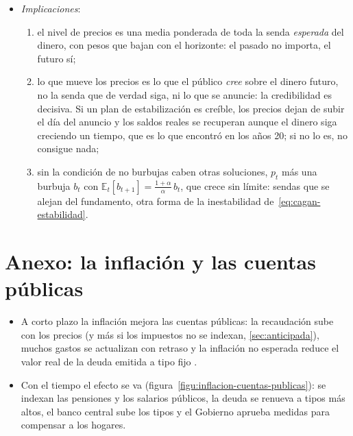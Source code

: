 \documentclass[11pt]{article}
\begin{document}
\begin{itemize}
\item \emph{Implicaciones}:
  \begin{enumerate}
  \item el nivel de precios es una media ponderada de toda la senda \emph{esperada} del dinero, con pesos que bajan con el horizonte: el pasado no importa, el futuro sí;
  \item lo que mueve los precios es lo que el público \emph{cree} sobre el dinero futuro, no la senda que de verdad siga, ni lo que se anuncie: la credibilidad es decisiva. Si un plan de estabilización es creíble, los precios dejan de subir el día del anuncio y los saldos reales se recuperan aunque el dinero siga creciendo un tiempo, que es lo que \textcite{Sargent1982Ends} encontró en los años 20; si no lo es, no consigue nada;
  \item sin la condición de no burbujas caben otras soluciones, $p_t$ más una burbuja $b_t$ con $\mathbb{E}_t[b_{t+1}]=\frac{1+\alpha}{\alpha}\,b_t$, que crece sin límite: sendas que se alejan del fundamento, otra forma de la inestabilidad de~\eqref{eq:cagan-estabilidad}.\findemo
  \end{enumerate}
\end{itemize}

\section{Anexo: la inflación y las cuentas públicas}\label{anexo:cuentas-publicas}

\begin{itemize}
\item A corto plazo la inflación mejora las cuentas públicas: la recaudación sube con los precios (y más si los impuestos no se indexan, \ref{sec:anticipada}), muchos gastos se actualizan con retraso y la inflación no esperada reduce el valor real de la deuda emitida a tipo fijo .
\item Con el tiempo el efecto se va (figura~\ref{figu:inflacion-cuentas-publicas}): se indexan las pensiones y los salarios públicos, la deuda se renueva a tipos más altos, el banco central sube los tipos y el Gobierno aprueba medidas para compensar a los hogares\nocite{FMI2023FiscalMonitor}.
\end{itemize}

\begin{infografia}[H]
\centering
\caption{Efectos de la inflación sobre las cuentas públicas}\label{figu:inflacion-cuentas-publicas}
\end{infografia}
\end{document}
